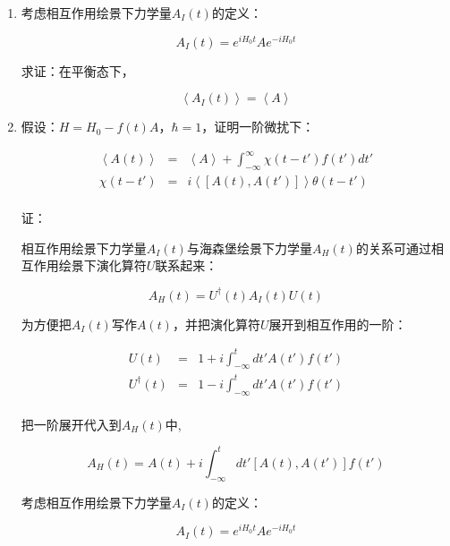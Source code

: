 \begin{enumerate}
\item 

考虑相互作用绘景下力学量$A_I(t)$的定义：

\begin{equation*}
A_I (t)  = e^{i H_0 t} A e^{- i H_0 t}
\end{equation*}

求证：在平衡态下，

\begin{equation}
\left\langle A_I (t) \right\rangle = \left\langle A \right\rangle
\end{equation}


\item

假设：$H = H_0 - f(t) A$，$\hbar = 1$，证明一阶微扰下：

\begin{eqnarray*}
\left\langle A(t) \right\rangle  & = & \left\langle A \right\rangle + \int_{-\infty}^{\infty} \chi(t - t') f(t') dt'  \\
\chi(t-t')  & = & i \left\langle [A(t), A(t')] \right\rangle \theta(t-t') \\
\end{eqnarray*}

证：

相互作用绘景下力学量$A_I (t)$与海森堡绘景下力学量$A_H (t)$的关系可通过相互作用绘景下演化算符$U$联系起来：

\begin{equation*}
A_H(t) = U^{\dagger}(t)  A_I(t) U(t)
\end{equation*}

为方便把$A_I (t)$写作$A(t)$，并把演化算符$U$展开到相互作用的一阶：

\begin{eqnarray*}
U(t) &=& 1+i \int_{-\infty}^t dt' A(t') f(t') \\
U^{\dagger}(t) &=& 1- i \int_{-\infty}^t dt' A(t') f(t')  \\
\end{eqnarray*}

把一阶展开代入到$A_H (t)$中,

\begin{equation}
A_H (t) = A(t) + i \int_{-\infty}^t dt' [A(t), A(t')] f(t')
\end{equation}

考虑相互作用绘景下力学量$A_I(t)$的定义：

\begin{equation*}
A_I (t)  = e^{i H_0 t} A e^{- i H_0 t}
\end{equation*}


\end{enumerate}
